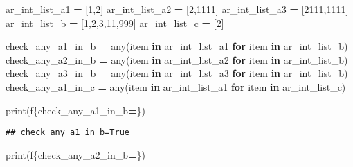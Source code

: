 \documentclass[
]{book}
\newenvironment{Shaded}{\begin{snugshade}}{\end{snugshade}}
\newcommand{\BuiltInTok}[1]{#1}
\newcommand{\ControlFlowTok}[1]{\textcolor[rgb]{0.13,0.29,0.53}{\textbf{#1}}}
\newcommand{\DecValTok}[1]{\textcolor[rgb]{0.00,0.00,0.81}{#1}}
\newcommand{\KeywordTok}[1]{\textcolor[rgb]{0.13,0.29,0.53}{\textbf{#1}}}
\newcommand{\NormalTok}[1]{#1}
\newcommand{\OperatorTok}[1]{\textcolor[rgb]{0.81,0.36,0.00}{\textbf{#1}}}
\newcommand{\SpecialCharTok}[1]{\textcolor[rgb]{0.00,0.00,0.00}{#1}}
\newcommand{\SpecialStringTok}[1]{\textcolor[rgb]{0.31,0.60,0.02}{#1}}
\begin{document}
\begin{Shaded}
\begin{Highlighting}[]
\NormalTok{ar\_int\_list\_a1 }\OperatorTok{=}\NormalTok{ [}\DecValTok{1}\NormalTok{,}\DecValTok{2}\NormalTok{]}
\NormalTok{ar\_int\_list\_a2 }\OperatorTok{=}\NormalTok{ [}\DecValTok{2}\NormalTok{,}\DecValTok{1111}\NormalTok{]}
\NormalTok{ar\_int\_list\_a3 }\OperatorTok{=}\NormalTok{ [}\DecValTok{2111}\NormalTok{,}\DecValTok{1111}\NormalTok{]}
\NormalTok{ar\_int\_list\_b }\OperatorTok{=}\NormalTok{ [}\DecValTok{1}\NormalTok{,}\DecValTok{2}\NormalTok{,}\DecValTok{3}\NormalTok{,}\DecValTok{11}\NormalTok{,}\DecValTok{999}\NormalTok{]}
\NormalTok{ar\_int\_list\_c }\OperatorTok{=}\NormalTok{ [}\DecValTok{2}\NormalTok{]}

\NormalTok{check\_any\_a1\_in\_b }\OperatorTok{=}  \BuiltInTok{any}\NormalTok{(item }\KeywordTok{in}\NormalTok{ ar\_int\_list\_a1 }\ControlFlowTok{for}\NormalTok{ item }\KeywordTok{in}\NormalTok{ ar\_int\_list\_b)}
\NormalTok{check\_any\_a2\_in\_b }\OperatorTok{=}  \BuiltInTok{any}\NormalTok{(item }\KeywordTok{in}\NormalTok{ ar\_int\_list\_a2 }\ControlFlowTok{for}\NormalTok{ item }\KeywordTok{in}\NormalTok{ ar\_int\_list\_b)}
\NormalTok{check\_any\_a3\_in\_b }\OperatorTok{=}  \BuiltInTok{any}\NormalTok{(item }\KeywordTok{in}\NormalTok{ ar\_int\_list\_a3 }\ControlFlowTok{for}\NormalTok{ item }\KeywordTok{in}\NormalTok{ ar\_int\_list\_b)}
\NormalTok{check\_any\_a1\_in\_c }\OperatorTok{=}  \BuiltInTok{any}\NormalTok{(item }\KeywordTok{in}\NormalTok{ ar\_int\_list\_a1 }\ControlFlowTok{for}\NormalTok{ item }\KeywordTok{in}\NormalTok{ ar\_int\_list\_c)}

\BuiltInTok{print}\NormalTok{(}\SpecialStringTok{f\textquotesingle{}}\SpecialCharTok{\{}\NormalTok{check\_any\_a1\_in\_b}\OperatorTok{=}\SpecialCharTok{\}}\SpecialStringTok{\textquotesingle{}}\NormalTok{)}
\end{Highlighting}
\end{Shaded}

\begin{verbatim}
## check_any_a1_in_b=True
\end{verbatim}

\begin{Shaded}
\begin{Highlighting}[]
\BuiltInTok{print}\NormalTok{(}\SpecialStringTok{f\textquotesingle{}}\SpecialCharTok{\{}\NormalTok{check\_any\_a2\_in\_b}\OperatorTok{=}\SpecialCharTok{\}}\SpecialStringTok{\textquotesingle{}}\NormalTok{)}
\end{Highlighting}
\end{Shaded}
\end{document}
